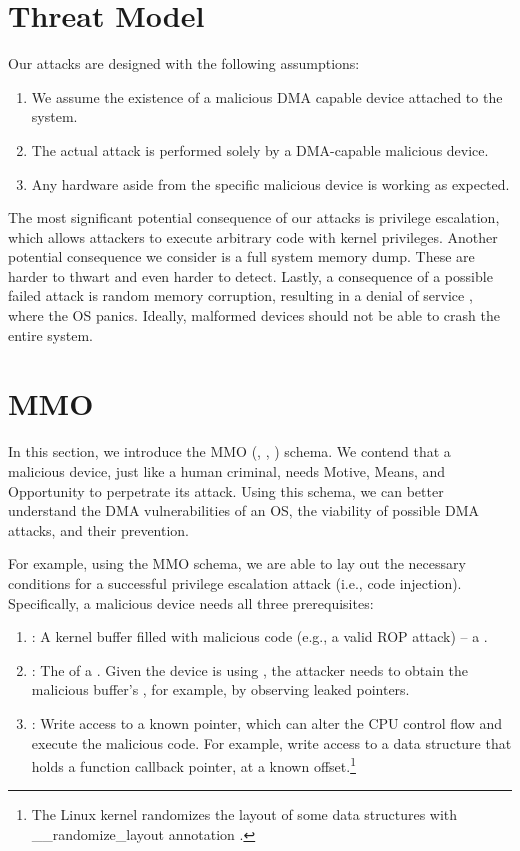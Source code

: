 

\section{Threat Model}\label{sec:threat_model}

Our attacks are designed with the following assumptions:
\begin{enumerate}
    \item We assume the existence of a malicious DMA capable device attached to the system.
    \item The actual attack is performed solely by a DMA-capable malicious device.
    \item Any hardware aside from the specific malicious device is working as expected.
 \end{enumerate}

The most significant potential consequence of our attacks is privilege escalation, which allows attackers to execute arbitrary code with kernel privileges. Another potential consequence we consider is a full system memory dump. These are harder to thwart and even harder to detect. Lastly, a consequence of a possible failed attack is random memory corruption, resulting in a denial of service \cite{MMT16}, where the OS panics. Ideally, malformed devices should not be able to crash the entire system. 

\section{MMO}\label{sec:mmo}

In this section, we introduce the MMO (\motivation, \means, \oportunity) schema. We contend that a malicious device, just like a human criminal, needs Motive, Means, and Opportunity to perpetrate its attack. Using this schema, we can better understand the DMA vulnerabilities of an OS, the viability of possible DMA attacks, and their prevention. 

For example, using the MMO schema, we are able to lay out the necessary conditions for a successful privilege escalation attack (i.e., code injection). Specifically, a malicious device needs all three prerequisites:
\begin{enumerate}
    \item \motivation: A kernel buffer filled with malicious code (e.g., a valid ROP attack) -- a \mabaf.
    \item \means: The \kva{} of a \mabaf. Given the device is using \iova, the attacker needs to obtain the malicious buffer's \kva{}, for example, by observing leaked pointers. 
    \item \oportunity: Write access to a known pointer, which can alter the CPU control flow and execute the malicious code. For example, write access to a data structure that holds a function callback pointer, at a known offset.\footnote{The Linux kernel randomizes the layout of some data structures with \_\_randomize\_layout annotation \cite{rand_layout}.}
\end{enumerate}

